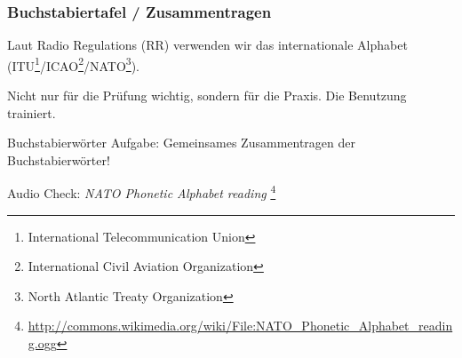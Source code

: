 \begin{frame}
  \frametitle{Buchstabiertafel / Zusammentragen}

  Laut Radio Regulations (RR) verwenden wir das internationale Alphabet
  (ITU\footnote{\tiny International Telecommunication
  Union}/ICAO\footnote{\tiny International Civil Aviation
  Organization}/NATO\footnote{\tiny North Atlantic Treaty Organization}).

  Nicht nur für die Prüfung wichtig, sondern für die Praxis. Die Benutzung
  trainiert.

  \begin{exampleblock}{Buchstabierwörter}
    Aufgabe: Gemeinsames Zusammentragen der Buchstabierwörter!
  \end{exampleblock}

  Audio Check: \emph{NATO Phonetic Alphabet reading}
  \footnote{\tiny \url{http://commons.wikimedia.org/wiki/File:NATO_Phonetic_Alphabet_reading.ogg}}

\end{frame}

